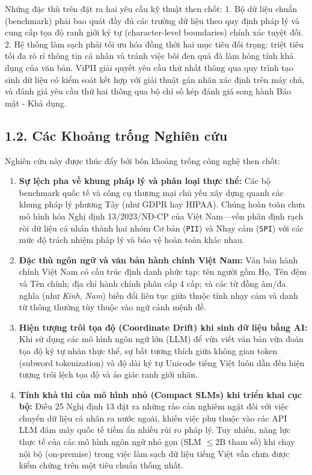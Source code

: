 \documentclass[
  11pt,
  a4paper,
]{article}
\providecommand{\tightlist}{%
  \setlength{\itemsep}{0pt}\setlength{\parskip}{0pt}}
\begin{document}
Những đặc thù trên đặt ra hai yêu cầu kỹ thuật then chốt: 1. Bộ dữ liệu chuẩn (benchmark) phải bao
quát đầy đủ các trường dữ liệu theo quy định pháp lý và cung cấp tọa độ ranh giới ký tự
(character-level boundaries) chính xác tuyệt đối. 2. Hệ thống làm sạch phải tối ưu hóa đồng thời hai
mục tiêu đối trọng: triệt tiêu tối đa rò rỉ thông tin cá nhân và tránh việc bôi đen quá đà làm hỏng
tính khả dụng của văn bản. ViPII giải quyết yêu cầu thứ nhất thông qua quy trình tạo sinh dữ liệu có
kiểm soát kết hợp với giải thuật gán nhãn xác định trên máy chủ, và đánh giá yêu cầu thứ hai thông
qua bộ chỉ số kép đánh giá song hành Bảo mật - Khả dụng.

\subsection{1.2. Các Khoảng trống Nghiên
cứu}\label{cuxe1c-khoux1ea3ng-trux1ed1ng-nghiuxean-cux1ee9u}

Nghiên cứu này được thúc đẩy bởi bốn khoảng trống công nghệ then chốt:

\begin{enumerate}
\def\labelenumi{\arabic{enumi}.}
\tightlist
\item
  \textbf{Sự lệch pha về khung pháp lý và phân loại thực thể:} Các bộ benchmark quốc tế và công cụ
  thương mại chủ yếu xây dựng quanh các khung pháp lý phương Tây (như GDPR hay HIPAA). Chúng hoàn
  toàn chưa mô hình hóa Nghị định 13/2023/NĐ-CP của Việt Nam---vốn phân định rạch ròi dữ liệu cá
  nhân thành hai nhóm Cơ bản (\texttt{PII}) và Nhạy cảm (\texttt{SPI}) với các mức độ trách nhiệm
  pháp lý và bảo vệ hoàn toàn khác nhau.
\item
  \textbf{Đặc thù ngôn ngữ và văn bản hành chính Việt Nam:} Văn bản hành chính Việt Nam có cấu trúc
  định danh phức tạp: tên người gồm Họ, Tên đệm và Tên chính; địa chỉ hành chính phân cấp 4 cấp; và
  các từ đồng âm/đa nghĩa (như \emph{Kinh}, \emph{Nam}) biến đổi liên tục giữa thuộc tính nhạy cảm
  và danh từ thông thường tùy thuộc vào ngữ cảnh mệnh đề.
\item
  \textbf{Hiện tượng trôi tọa độ (Coordinate Drift) khi sinh dữ liệu bằng AI:} Khi sử dụng các mô
  hình ngôn ngữ lớn (LLM) để vừa viết văn bản vừa đoán tọa độ ký tự nhãn thực thể, sự bất tương
  thích giữa không gian token (subword tokenization) và độ dài ký tự Unicode tiếng Việt luôn dẫn đến
  hiện tượng trôi lệch tọa độ và ảo giác ranh giới nhãn.
\item
  \textbf{Tính khả thi của mô hình nhỏ (Compact SLMs) khi triển khai cục bộ:} Điều 25 Nghị định 13
  đặt ra những rào cản nghiêm ngặt đối với việc chuyển dữ liệu cá nhân ra nước ngoài, khiến việc phụ
  thuộc vào các API LLM đám mây quốc tế tiềm ẩn nhiều rủi ro pháp lý. Tuy nhiên, năng lực thực tế
  của các mô hình ngôn ngữ nhỏ gọn (SLM \(\le 2\text{B}\) tham số) khi chạy nội bộ (on-premise)
  trong việc làm sạch dữ liệu tiếng Việt vẫn chưa được kiểm chứng trên một tiêu chuẩn thống nhất.
\end{enumerate}
\end{document}
